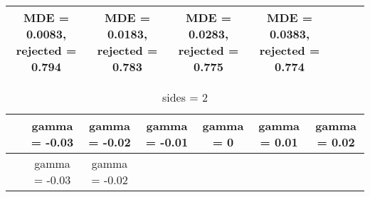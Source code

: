 \documentclass[
]{article}
\begin{document}
\begin{longtable}[]{@{}ccccccc@{}}
\begin{minipage}[t]{0.12\columnwidth}
MDE = 0.0083, rejected = 0.794\strut
\end{minipage} & \begin{minipage}[t]{0.12\columnwidth}\centering
MDE = 0.0183, rejected = 0.783\strut
\end{minipage} & \begin{minipage}[t]{0.12\columnwidth}\centering
MDE = 0.0283, rejected = 0.775\strut
\end{minipage} & \begin{minipage}[t]{0.12\columnwidth}\centering
MDE = 0.0383, rejected = 0.774\strut
\end{minipage}\tabularnewline
\bottomrule
\end{longtable}

\begin{longtable}[]{@{}ccccccc@{}}
\caption{sides = 2}\tabularnewline
\toprule
\begin{minipage}[b]{0.08\columnwidth}\centering
~\strut
\end{minipage} & \begin{minipage}[b]{0.08\columnwidth}\centering
gamma = -0.03\strut
\end{minipage} & \begin{minipage}[b]{0.08\columnwidth}\centering
gamma = -0.02\strut
\end{minipage} & \begin{minipage}[b]{0.08\columnwidth}\centering
gamma = -0.01\strut
\end{minipage} & \begin{minipage}[b]{0.16\columnwidth}\centering
gamma = 0\strut
\end{minipage} & \begin{minipage}[b]{0.16\columnwidth}\centering
gamma = 0.01\strut
\end{minipage} & \begin{minipage}[b]{0.16\columnwidth}\centering
gamma = 0.02\strut
\end{minipage}\tabularnewline
\midrule
\endfirsthead
\toprule
\begin{minipage}[b]{0.08\columnwidth}\centering
~\strut
\end{minipage} & \begin{minipage}[b]{0.08\columnwidth}\centering
gamma = -0.03\strut
\end{minipage} & \begin{minipage}[b]{0.08\columnwidth}\centering
gamma = -0.02\strut
\end{minipage} & \begin{minipage}[b]{0.08\columnwidth}\centering

\end{minipage}
\end{longtable}
\end{document}
